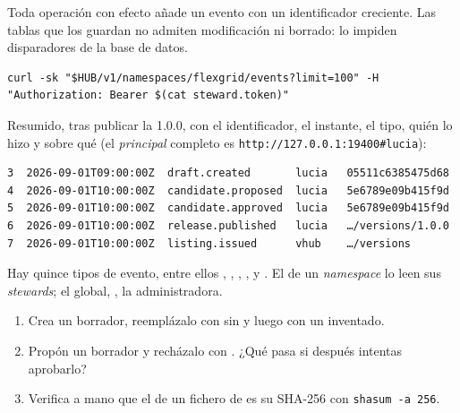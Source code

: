 Toda operación con efecto añade un evento con un identificador creciente. Las tablas que los guardan no
admiten modificación ni borrado: lo impiden disparadores de la base de datos.

\begin{lstlisting}[style=sh]
curl -sk "$HUB/v1/namespaces/flexgrid/events?limit=100" -H "Authorization: Bearer $(cat steward.token)"
\end{lstlisting}

Resumido, tras publicar la 1.0.0, con el identificador, el instante, el tipo, quién lo hizo y sobre qué
(el \emph{principal} completo es \texttt{http://127.0.0.1:19400\#lucia}):

\begin{lstlisting}[style=out]
3  2026-09-01T09:00:00Z  draft.created       lucia   05511c6385475d68
4  2026-09-01T10:00:00Z  candidate.proposed  lucia   5e6789e09b415f9d
5  2026-09-01T10:00:00Z  candidate.approved  lucia   5e6789e09b415f9d
6  2026-09-01T10:00:00Z  release.published   lucia   …/versions/1.0.0
7  2026-09-01T10:00:00Z  listing.issued      vhub    …/versions
\end{lstlisting}

Hay quince tipos de evento, entre ellos , ,
, ,  y . El de un
\emph{namespace} lo leen sus \emph{stewards}; el global, , la administradora.

\begin{retos}
\begin{enumerate}[leftmargin=*, itemsep=2pt]
  \item Crea un borrador, reemplázalo con  sin  y luego con un  inventado.
  \item Propón un borrador y recházalo con . ¿Qué pasa si después intentas aprobarlo?
  \item Verifica a mano que el  de un fichero de  es su SHA-256 con \texttt{shasum -a 256}.
\end{enumerate}
\end{retos}
